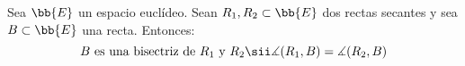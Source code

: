 \begin{prop} \label{prop:BisectrizDivideAngulo}
    Sea $\bb{E}$ un espacio euclídeo. Sean $R_1,R_2\subset \bb{E}$ dos rectas secantes y sea $B\subset \bb{E}$ una recta. Entonces:
    \begin{equation*}
        B \text{ es una bisectriz de $R_1$ y $R_2$} \sii \measuredangle(R_1,B) = \measuredangle(R_2,B)
    \end{equation*}
\end{prop}
\begin{comment}
\begin{proof}
    Sea $p\in R_1\cap R_2$. Consideramos $u_a,u_b\in \vec{\bb{E}}$ tales que:
    \begin{equation*}
        u_a := \frac{v_1}{\|v_1\|} + \frac{v_2}{\|v_2\|} \qquad u_b := \frac{v_1}{\|v_1\|} - \frac{v_2}{\|v_2\|}
    \end{equation*}
    donde $v_1,v_2$ son los vectores directores \ul{unitarios} de $R_1$ y $R_2$ respectivamente. Sean las bisectrices $B_a=p+\cc{L}\{u_a\}$ y $B_b=p+\cc{L}\{u_b\}$.
    Tenemos que:
    \begin{equation*}
        \langle u_a, v_1\rangle
        = \left\langle \frac{v_1}{\|v_1\|} + \frac{v_2}{\|v_2\|}, v_1\right\rangle
        = \frac{1}{\|v_1\|}\langle v_1,v_1\rangle + \frac{1}{\|v_2\|}\langle v_2,v_1\rangle = \|v_1\| + \frac{1}{\|v_2\|} \langle v_2,v_1\rangle
    \end{equation*}
    \begin{equation*}
        \langle u_a, v_2\rangle
        = \left\langle \frac{v_1}{\|v_1\|} + \frac{v_2}{\|v_2\|}, v_2\right\rangle
        = \frac{1}{\|v_1\|}\langle v_1,v_2\rangle + \frac{1}{\|v_2\|}\langle v_2,v_2\rangle = \frac{1}{\|v_1\|} \langle v_1,v_2\rangle + \|v_2\|
    \end{equation*}
    \begin{equation*}
        \|v_1\|\cdot \left\|u_a\right\| = \|v_1\|\cdot \left\| \frac{v_1}{\|v_1\|} + \frac{v_2}{\|v_2\|}\right\|
        = \left\|v_1 + \frac{\|v_1\|}{\|v_2\|}\cdot v_2\right\|
    \end{equation*}
    \begin{equation*}
        \|v_2\|\cdot \left\|u_a\right\| = \|v_2\|\cdot \left\| \frac{v_1}{\|v_1\|} + \frac{v_2}{\|v_2\|}\right\|
        = \left\|\frac{\|v_2\|}{\|v_1\|}\cdot v_1 + v_2\right\|
    \end{equation*}

    Usando que $\langle v_1,v_2\rangle = \langle v_2,v_1\rangle$ y que, por la elección de $v_1,v_2$ con $\|v_1\|=\|v_2\|=1$, tenemos que:
    \begin{equation*}
        \cos \measuredangle(v_1,u_a) = \cos \measuredangle(v_2,u_a) 
    \end{equation*}


    Para comprobar que el ángulo es el mismo, basta comprobar que el ángulo entre los vectores directores de $R_1$ y $B_a$ es el mismo que el ángulo entre los vectores directores de $R_2$ y $B_a$. Es decir, basta comprobar que:
\end{proof}
\end{comment}

